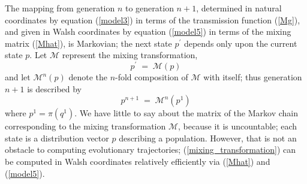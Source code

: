 The mapping from generation $n$ to generation $n+1$, determined in
natural coordinates by equation (\ref{model3}) in terms of the
transmission function (\ref{Mg}), and given in Walsh coordinates by
equation (\ref{model5}) in terms of the mixing matrix (\ref{Mhat}), is
Markovian; the next state $p^\prime$ depends only upon the current
state $p$.  Let $\mathcal{M}$ represent the mixing transformation,
\begin{equation} \label{mixing_transformation}
p^\prime \; = \; \mathcal{M}(p)
\end{equation}
and let $\mathcal{M}^n(p)$ denote the $n$-fold composition of
$\mathcal{M}$ with itself; thus generation $n+1$ is described by
\[
p^{n+1} \; = \; \mathcal{M}^n(p^1)
\]
where $p^1 = \pi (q^1)$.  We have little to say
about the matrix of the Markov chain corresponding to the mixing
transformation $\mathcal{M}$, because it is uncountable; each state is
a distribution vector $p$ describing a population. However, that is
not an obstacle to computing evolutionary trajectories;
(\ref{mixing_transformation}) can be computed in Walsh coordinates
relatively efficiently via (\ref{Mhat}) and (\ref{model5}).
